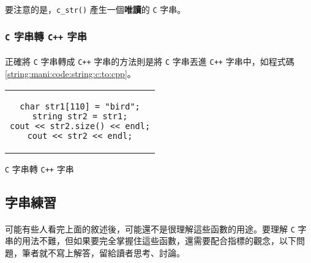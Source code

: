 \documentclass[12pt,a4paper,oneside]{report}
\begin{document}
\begin{CJK}{UTF8}{bkai}
\paragraph{}要注意的是，\lstinline!c_str()! 產生一個\textbf{唯讀}的 \texttt{C} 字串。

\subsubsection{\texttt{C} 字串轉 \texttt{C++} 字串}

\paragraph{}正確將 \texttt{C} 字串轉成 \texttt{C++} 字串的方法則是將 \texttt{C} 字串丟進 \texttt{C++} 字串中，如程式碼 \ref{string:mani:code:string:c:to:cpp}。

\begin{code}[h!]
  \centering
  \begin{tabular}{c}
  \begin{lstlisting}
char str1[110] = "bird";
string str2 = str1;
cout << str2.size() << endl;
cout << str2 << endl;
  \end{lstlisting}
  \end{tabular}
  \caption{\texttt{C} 字串轉 \texttt{C++} 字串}
  \label{string:mani:code:string:c:to:cpp}
\end{code}

\subsection{字串練習}

\paragraph{}可能有些人看完上面的敘述後，可能還不是很理解這些函數的用途。要理解 \texttt{C} 字串的用法不難，但如果要完全掌握住這些函數，還需要配合指標的觀念，以下問題，筆者就不寫上解答，留給讀者思考、討論。


\end{CJK}
\end{document}
